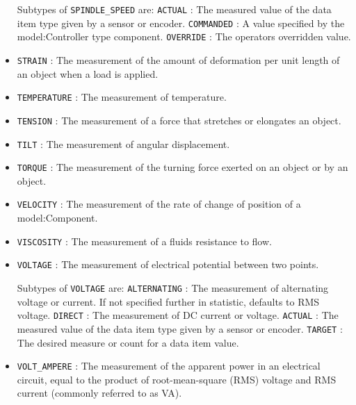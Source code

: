 \begin{itemize}
Subtypes of \texttt{SPINDLE_SPEED} are: 
\newline\tab \texttt{ACTUAL} : The measured value of the data item type given by a sensor or encoder. 
\newline\tab \texttt{COMMANDED} : A value specified by the {model:Controller} type component. 
\newline\tab \texttt{OVERRIDE} : The operators overridden value. 
\item \texttt{STRAIN} : The measurement of the amount of deformation per unit length of an object when a load is applied. 

\item \texttt{TEMPERATURE} : The measurement of temperature. 

\item \texttt{TENSION} : The measurement of a force that stretches or elongates an object. 

\item \texttt{TILT} : The measurement of angular displacement. 

\item \texttt{TORQUE} : The measurement of the turning force exerted on an object or by an object. 

\item \texttt{VELOCITY} : The measurement of the rate of change of position of a {model:Component}. 

\item \texttt{VISCOSITY} : The measurement of a fluids resistance to flow. 

\item \texttt{VOLTAGE} : The measurement of electrical potential between two points. 

Subtypes of \texttt{VOLTAGE} are: 
\newline\tab \texttt{ALTERNATING} : The measurement of alternating voltage or current.   If not specified further in statistic, defaults to RMS voltage.  
\newline\tab \texttt{DIRECT} : The measurement of DC current or voltage. 
\newline\tab \texttt{ACTUAL} : The measured value of the data item type given by a sensor or encoder. 
\newline\tab \texttt{TARGET} : The desired measure or count for a data item value. 
\item \texttt{VOLT_AMPERE} : The measurement of the apparent power in an electrical circuit, equal to the product of root-mean-square (RMS) voltage and RMS current (commonly referred to as VA). 


\end{itemize}
